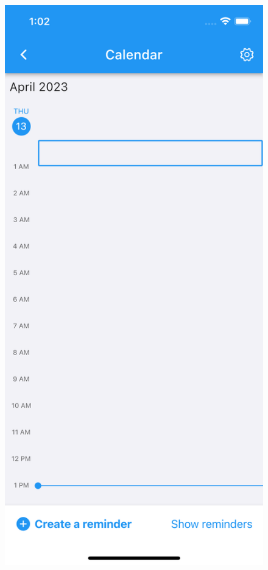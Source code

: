\begin{figure}
\begin{minipage}{.5\textwidth}
  \includegraphics[width=0.8\linewidth]{res/calendar_view2.png}
  \label{fig:calendar_view2}
\end{minipage}%
\end{figure}

